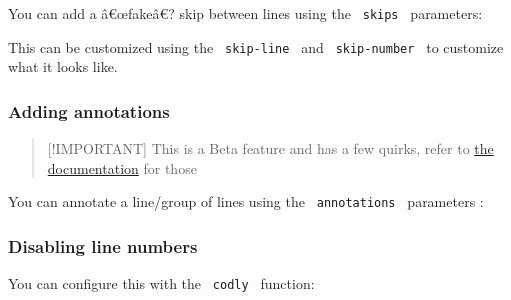 You can add a â€œfakeâ€? skip between lines using the \texttt{\ skips\ }
parameters:

\begin{Shaded}
\begin{Highlighting}[]
\end{Highlighting}
\end{Shaded}

This can be customized using the \texttt{\ skip-line\ } and
\texttt{\ skip-number\ } to customize what it looks like.

\subsubsection{Adding annotations}\label{adding-annotations}

\begin{quote}
{[}!IMPORTANT{]} This is a Beta feature and has a few quirks, refer to
\href{https://raw.githubusercontent.com/Dherse/codly/main/docs.pdf}{the
documentation} for those
\end{quote}

You can annotate a line/group of lines using the
\texttt{\ annotations\ } parameters :

\begin{Shaded}
\begin{Highlighting}[]
\NormalTok{    (}
\NormalTok{        )}
\NormalTok{      )}
\NormalTok{    ), }
\NormalTok{  )}
\NormalTok{)}
\end{Highlighting}
\end{Shaded}

\subsubsection{Disabling line numbers}\label{disabling-line-numbers}

You can configure this with the \texttt{\ codly\ } function:

\begin{Shaded}
\begin{Highlighting}[]
\end{Highlighting}
\end{Shaded}

